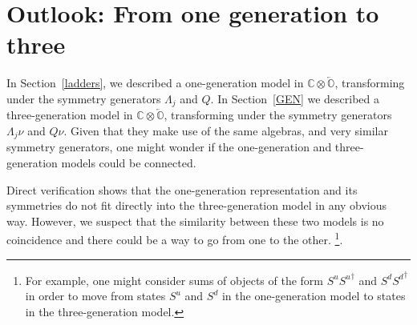 \documentclass[letterpaper,12pt,titlepage,oneside,final]{book}
\newcommand{\COOO}{\mathbb{C}\otimes\overleftarrow{\mathbb{O}}}
\begin{document}










\section{Outlook:  From one generation to three}


In Section~\ref{ladders}, we described a one-generation model in $\COOO$, transforming under the symmetry generators $\Lambda_j$ and $Q$.  
In Section~\ref{GEN} we described a  three-generation model in $\COOO$, transforming under the symmetry generators $\Lambda_j\nu$ and $Q\nu$. 
Given that they make use of the same algebras, and very similar symmetry generators, one might wonder if the one-generation and three-generation models could be connected.  

Direct verification shows that the one-generation representation and its symmetries do not fit directly into the three-generation model in any obvious way.  However, we suspect that the similarity between these two models is no coincidence and there could be a way to go from one to the other.  \footnote{For example, one might consider sums of objects of the form $S^u{S^u}^{\dagger}$ and $S^d{S^d}^{\dagger}$ in order to move from states $S^u$ and $S^d$ in the one-generation model to states in the three-generation model.}.  

 
\end{document}
